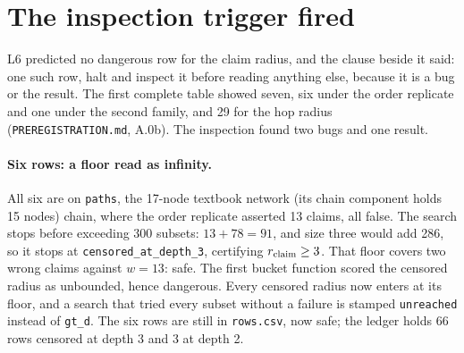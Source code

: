 
\begin{antes}
\end{antes}

\section{The inspection trigger fired}\label{sec:t4-trigger}

L6 predicted no dangerous row for the claim radius, and the clause beside it said: one such row, halt
and inspect it before reading anything else, because it is a bug or the result. The first complete
table showed seven, six under the order replicate and one under the second family, and 29 for the hop
radius (\texttt{PREREGISTRATION.md}, A.0b). The inspection found two bugs and one result.

\paragraph{Six rows: a floor read as infinity.} All six are on \texttt{paths}, the 17-node textbook network (its chain component holds 15 nodes)
chain, where the order replicate asserted 13 claims, all false. The search stops before exceeding 300
subsets: $13 + 78 = 91$, and size three would add 286, so it stops at \texttt{censored\_at\_depth\_3},
certifying $r_{\mathrm{claim}} \ge 3$. That floor covers two wrong claims against $w = 13$: safe. The first bucket
function scored the censored radius as unbounded, hence dangerous. Every censored radius now enters at
its floor, and a search that tried every subset without a failure is stamped \texttt{unreached} instead
of \texttt{gt\_d}. The six rows are still in \texttt{rows.csv}, now safe; the ledger holds 66 rows
censored at depth 3 and 3 at depth 2.

